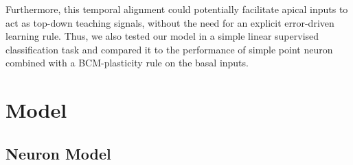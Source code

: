 \documentclass[10pt,a4paper,twocolumn]{article}
\begin{document}
		Furthermore, this temporal alignment could potentially facilitate apical inputs to act
		as top-down teaching signals, without the need for an explicit error-driven
		learning rule. Thus, we also tested our model in a simple linear 
		supervised classification task and compared it to the performance of simple
		point neuron combined with a BCM-plasticity rule on the basal inputs.
		
		\section{Model}
		
		\subsection{Neuron Model}
		
\end{document}
